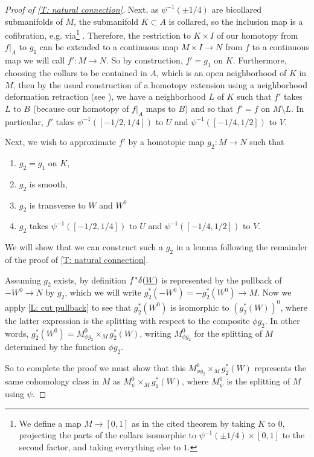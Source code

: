 \begin{proof}[Proof of \cref{T: natural connection}]
	Next, as $\psi^{-1}(\pm 1/4)$ are bicollared submanifolds of $M$, the submanifold $K \subset A$ is collared, so the inclusion map is a cofibration, e.g. via\footnote{We define a map $M \to [0,1]$ as in the cited theorem by taking $K$ to $0$, projecting the parts of the collars isomorphic to $\psi^{-1}(\pm 1/4) \times [0,1]$ to the second factor, and taking everything else to $1$.} \cite[Theorem VII.1.5]{Bred97}.
	Therefore, the restriction to $K \times I$ of our homotopy from $f|_A$ to $g_1$ can be extended to a continuous map $M \times I \to N$ from $f$ to a continuous map we will call $f' \colon M \to N$.
	So by construction, $f' = g_1$ on $K$.
	Furthermore, choosing the collars to be contained in $A$, which is an open neighborhood of $K$ in $M$, then by the usual construction of a homotopy extension using a neighborhood deformation retraction (see \cite[Section VII.1]{Bred97}), we have a neighborhood $L$ of $K$ such that $f'$ takes $L$ to $B$ (because our homotopy of $f|_A$ maps to $B$) and so that $f' = f$ on $M \setminus L$.
	In particular, $f'$ takes $\psi^{-1}([-1/2,1/4])$ to $U$ and $\psi^{-1}([-1/4,1/2])$ to $V$.

	Next, we wish to approximate $f'$ by a homotopic map $g_2 \colon M \to N$ such that
	\begin{enumerate}
		\item $g_2 = g_1$ on $K$,
		\item $g_2$ is smooth,
		\item $g_2$ is transverse to $W$ and $W^0$
		\item $g_2$ takes $\psi^{-1}([-1/2,1/4])$ to $U$ and $\psi^{-1}([-1/4,1/2])$ to $V$.
	\end{enumerate}
	We will show that we can construct such a $g_2$ in a lemma following the remainder of the proof of \cref{T: natural connection}.

	Assuming $g_2$ exists, by definition $f^* \delta (\underline{W})$ is represented by the pullback of $-W^0 \to N$ by $g_2$, which we will write $g_2^*(-W^0) = - g_2^*(W^0) \to M$.
	Now we apply \cref{L: cut pullback} to see that $g_2^*(W^0)$ is isomorphic to $(g_2^*(W))^0$, where the latter expression is the splitting with respect to the composite $\phi g_2$.
	In other words, $g_2^*(W^0) = M^0_{\phi g_2} \times_M g_2^*(W)$, writing $M^0_{\phi g_2}$ for the splitting of $M$ determined by the function $\phi g_2$.

	So to complete the proof we must show that this $M^0_{\phi g_2} \times_M g_2^*(W)$ represents the same cohomology class in $M$ as $M^0_\psi \times_M g_1^*(W)$, where $M^0_\psi$ is the splitting of $M$ using $\psi$.


\end{proof}
